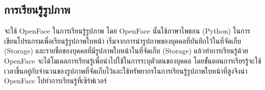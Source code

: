 \subsection{การเรียนรู้รูปภาพ}
จะใช้ OpenFace ในการเรียนรู้รูปภาพ โดย OpenFace นั้นใช้ภาษาไพธอน (Python) ในการเขียนโปรแกรมเพื่อเรียนรู้รูปภาพใบหน้า เริ่มจากการนำรูปภาพของบุคคลที่บันทึกไว้ในที่จัดเก็บ (Storage) 
และรายชื่อของบุคคลที่มีรูปภาพใบหน้าในที่จัดเก็บ (Storage) แล้วทำการเรียนรู้ด้วย OpenFace จะได้โมเดลการเรียนรู้เพื่อนำไปใช้ในการระบุตัวตนของบุคคล 
โดยขั้นตอนการเรียรรู้จะใช้เวลาขึ้นอยู่กับจำนวนของรูปภาพที่จัดเก็บไว้และใช้ทรัพยากรในการเรียนรู้รูปภาพใบหน้าที่สูงจึงนำ OpenFace ไปทำการเรียนรู้ที่เซิร์ฟเวอร์

